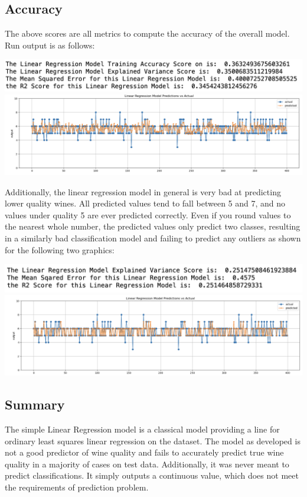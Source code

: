 \documentclass[titlepage]{article}
\begin{document}
	\subsection*{Accuracy}
	The above scores are all metrics to compute the accuracy of the overall model. Run output is as follows:\\
	\begin{center}
		\includegraphics[width=.75\textwidth]{img/img1.png}\newline
		\includegraphics[width=.75\textwidth]{img/img2.png}
	\end{center}
	Additionally, the linear regression model in general is very bad at predicting lower quality wines. All predicted values tend to fall between 5 and 7, and no values under quality 5 are ever predicted correctly.  Even if you round values to the nearest whole number, the predicted values only predict two classes, resulting in a similarly bad classification model and failing to predict any outliers as shown for the following two graphics: 
	\begin{center}
		\includegraphics[width=.75\textwidth]{img/img3.png}\newline
		\includegraphics[width=.75\textwidth]{img/img4.png}
	\end{center}
		\subsection*{Summary}
		The simple Linear Regression model is a classical model providing a line for ordinary least squares linear regression on the dataset. The model as developed is not a good predictor of wine quality and fails to accurately predict true wine quality in a majority of cases on test data.  Additionally, it was never meant to predict classifications.  It simply outputs a continuous value, which does not meet the requirements of prediction problem.
\end{document}
